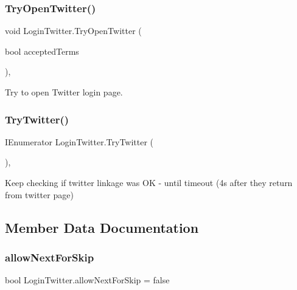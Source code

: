 \mbox{\label{class_login_twitter_a61c2451a8162c3b5e3e7f4fbec0940c1}} 
\subsubsection{\texorpdfstring{TryOpenTwitter()}{TryOpenTwitter()}}
{\footnotesize\ttfamily void Login\+Twitter.\+Try\+Open\+Twitter (\begin{DoxyParamCaption}\item[{bool}]{accepted\+Terms }\end{DoxyParamCaption})\hspace{0.3cm}{\ttfamily [inline]}, {\ttfamily [private]}}



Try to open Twitter login page. 

\mbox{\label{class_login_twitter_a45104792188cdefa496e01daf069a9e9}} 
\subsubsection{\texorpdfstring{TryTwitter()}{TryTwitter()}}
{\footnotesize\ttfamily I\+Enumerator Login\+Twitter.\+Try\+Twitter (\begin{DoxyParamCaption}{ }\end{DoxyParamCaption})\hspace{0.3cm}{\ttfamily [inline]}, {\ttfamily [private]}}



Keep checking if twitter linkage was OK -\/ until timeout (4s after they return from twitter page) 



\subsection{Member Data Documentation}
\mbox{\label{class_login_twitter_ab5b6026e105743976dbc6d21ce55f83c}} 
\subsubsection{\texorpdfstring{allowNextForSkip}{allowNextForSkip}}
{\footnotesize\ttfamily bool Login\+Twitter.\+allow\+Next\+For\+Skip = false\hspace{0.3cm}{\ttfamily [static]}}



